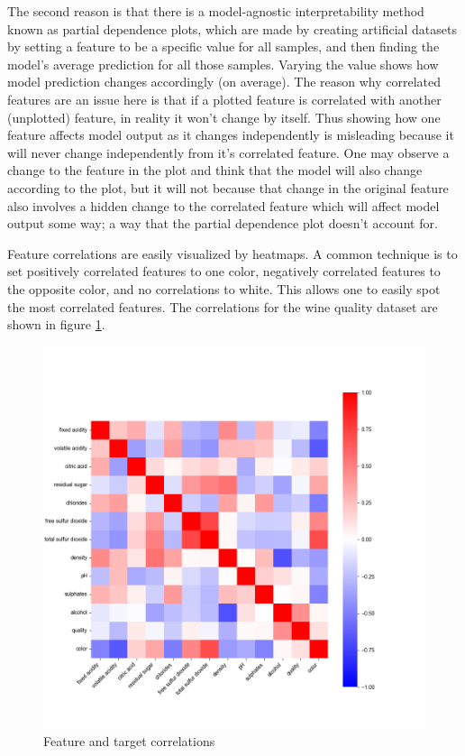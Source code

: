 \documentclass[12pt, letterpaper]{article}
\begin{document}
The second reason is that there is a model-agnostic interpretability method known as partial dependence plots, which are made by creating artificial datasets by setting a feature to be a specific value for all samples, and then finding the model's average prediction for all those samples. Varying the value shows how model prediction changes accordingly (on average). The reason why correlated features are an issue here is that if a plotted feature is correlated with another (unplotted) feature, in reality it won't change by itself. Thus showing how one feature affects model output as it changes independently is misleading because it will never change independently from it's correlated feature. One may observe a change to the feature in the plot and think that the model will also change according to the plot, but it will not because that change in the original feature also involves a hidden change to the correlated feature which will affect model output some way; a way that the partial dependence plot doesn't account for.

Feature correlations are easily visualized by heatmaps. A common technique is to set positively correlated features to one color, negatively correlated features to the opposite color, and no correlations to white. This allows one to easily spot the most correlated features. The correlations for the wine quality dataset are shown in figure \ref{corr}.

\begin{figure}[H]
    \centering
    \includegraphics[scale=0.625]{correlations.png}
    \caption{Feature and target correlations}
    \label{corr} %
\end{figure}
\end{document}
